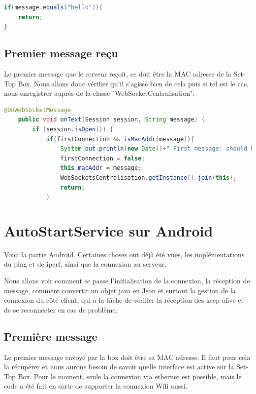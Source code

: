 \begin{lstlisting}[language=Java, caption={Réception d'un keep alive sur le serveur}]
if(message.equals("hello")){
	return;
}
\end{lstlisting}

\subsection{Premier message reçu}
Le premier message que le serveur reçoit, ce doit être la MAC adresse de la Set-Top Box. Nous allons donc vérifier qu'il s'agisse bien de cela puis si tel est le cas, nous enregistrer auprès de la classe "WebSocketCentralisation".

\begin{lstlisting}[language=Java, caption={Code d'enregistrement de la Set-Top Box}]
@OnWebSocketMessage
    public void onText(Session session, String message) {
        if (session.isOpen()) {
        	if(firstConnection && isMacAddr(message)){
        		System.out.println(new Date()+" First message: should be mac addr: "+message);
        		firstConnection = false;
        		this.macAddr = message;
        		WebSocketsCentralisation.getInstance().join(this);
        		return;
        	}
\end{lstlisting}

\section{AutoStartService sur Android}
Voici la partie Android. Certaines choses ont déjà été vues, les implémentations du ping et de iperf, ainsi que la connexion au serveur.

Nous allons voir comment se passe l'initialisation de la connexion, la réception de message, comment convertir un objet java en Json et surtout la gestion de la connexion du côté client, qui a la tâche de vérifier la réception des keep alive et de se reconnecter en cas de problème.

\subsection{Première message}
Le premier message envoyé par la box doit être sa MAC adresse. Il faut pour cela la récupérer et nous aurons besoin de savoir quelle interface est active sur la Set-Top Box. Pour le moment, seule la connexion via ethernet est possible, mais le code a été fait en sorte de supporter la connexion Wifi aussi.

